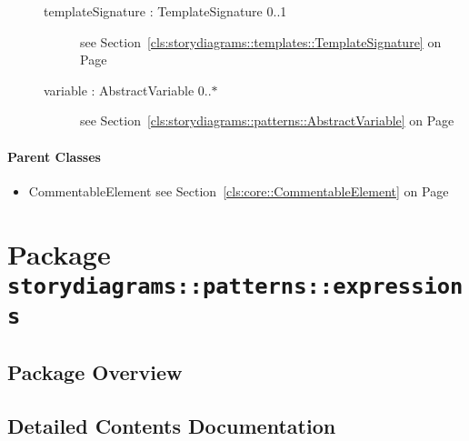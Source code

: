 \begin{description}
\begin{description}
	
\item[templateSignature : TemplateSignature 			\symbol{"5B}0..1\symbol{"5D}]
see Section~\ref{cls:storydiagrams::templates::TemplateSignature} on Page~\pageref{cls:storydiagrams::templates::TemplateSignature}
\hspace{\fill}
\nopagebreak


	
\item[variable : AbstractVariable 			\symbol{"5B}0..$*$\symbol{"5D}]
see Section~\ref{cls:storydiagrams::patterns::AbstractVariable} on Page~\pageref{cls:storydiagrams::patterns::AbstractVariable}
\hspace{\fill}
\nopagebreak


	
	\end{description}
	

\end{description}

\paragraph{Parent Classes}
\begin{itemize}
\item CommentableElement see Section~\ref{cls:core::CommentableElement} on Page~\pageref{cls:core::CommentableElement}\end{itemize}
\newpage
		


\section{Package \bfseries \texttt{storydiagrams::patterns::expressions}\normalfont}
\subsection{Package Overview}
	
			
		



\subsection{Detailed Contents Documentation}
